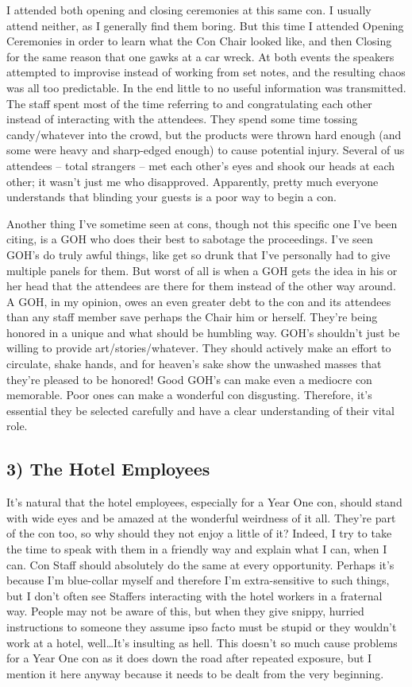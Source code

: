 I attended both opening and closing ceremonies at this same con. I usually attend neither, as I generally find them boring. But this time I attended Opening Ceremonies in order to learn what the Con Chair looked like, and then Closing for the same reason that one gawks at a car wreck. At both events the speakers attempted to improvise instead of working from set notes, and the resulting chaos was all too predictable. In the end little to no useful information was transmitted. The staff spent most of the time referring to and congratulating each other instead of interacting with the attendees. They spend some time tossing candy/whatever into the crowd, but the products were thrown hard enough (and some were heavy and sharp-edged enough) to cause potential injury. Several of us attendees -- total strangers -- met each other's eyes and shook our heads at each other; it wasn't just me who disapproved. Apparently, pretty much everyone understands that blinding your guests is a poor way to begin a con.

Another thing I've sometime seen at cons, though not this specific one I've been citing, is a GOH who does their best to sabotage the proceedings. I've seen GOH's do truly awful things, like get so drunk that I've personally had to give multiple panels for them. But worst of all is when a GOH gets the idea in his or her head that the attendees are there for them instead of the other way around. A GOH, in my opinion, owes an even greater debt to the con and its attendees than any staff member save perhaps the Chair him or herself. They're being honored in a unique and what should be humbling way. GOH's shouldn't just be willing to provide art/stories/whatever. They should actively make an effort to circulate, shake hands, and for heaven's sake show the unwashed masses that they're pleased to be honored! Good GOH's can make even a mediocre con memorable. Poor ones can make a wonderful con disgusting. Therefore, it's essential they be selected carefully and have a clear understanding of their vital role.

\subsection*{3) The Hotel Employees}

It's natural that the hotel employees, especially for a Year One con, should stand with wide eyes and be amazed at the wonderful weirdness of it all. They're part of the con too, so why should they not enjoy a little of it? Indeed, I try to take the time to speak with them in a friendly way and explain what I can, when I can. Con Staff should absolutely do the same at every opportunity. Perhaps it's because I'm blue-collar myself and therefore I'm extra-sensitive to such things, but I don't often see Staffers interacting with the hotel workers in a fraternal way. People may not be aware of this, but when they give snippy, hurried instructions to someone they assume ipso facto must be stupid or they wouldn't work at a hotel, well\ldots It's insulting as hell. This doesn't so much cause problems for a Year One con as it does down the road after repeated exposure, but I mention it here anyway because it needs to be dealt from the very beginning.

